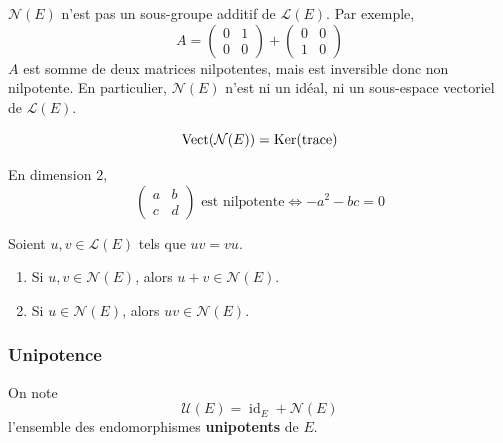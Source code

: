   \begin{remark}
    $\mathcal{N}(E)$ n'est pas un sous-groupe additif de $\mathcal{L}(E)$. Par exemple,
    \[
      A =
      \begin{pmatrix}
        0 & 1 \\
        0 & 0
      \end{pmatrix}
      +
      \begin{pmatrix}
        0 & 0 \\
        1 & 0
      \end{pmatrix}
    \]
    $A$ est somme de deux matrices nilpotentes, mais est inversible donc non nilpotente. En particulier, $\mathcal{N}(E)$ n'est ni un idéal, ni un sous-espace vectoriel de $\mathcal{L}(E)$.
  \end{remark}

  \begin{proposition}
    \[ \operatorname{Vect}(\mathcal{N}(E)) = \mathrm{Ker}(\operatorname{trace}) \]
  \end{proposition}

  \begin{example}
    En dimension $2$,
    \[
      \begin{pmatrix}
        a & b \\
        c & d
      \end{pmatrix}
      \text{ est nilpotente}
      \iff
      -a^2 -bc = 0
    \]
  \end{example}

  \begin{proposition}
    Soient $u, v \in \mathcal{L}(E)$ tels que $uv = vu$.
    \begin{enumerate}[label={\bfseries(\roman*)}]
      \item Si $u, v \in \mathcal{N}(E)$, alors $u + v \in \mathcal{N}(E)$.
      \item Si $u \in \mathcal{N}(E)$, alors $uv \in \mathcal{N}(E)$.
    \end{enumerate}
  \end{proposition}

  \subsubsection{Unipotence}


  \begin{definition}
    On note
    \[ \mathcal{U}(E) = \operatorname{id}_E + \mathcal{N}(E) \]
    l'ensemble des endomorphismes \textbf{unipotents} de $E$.
  \end{definition}

